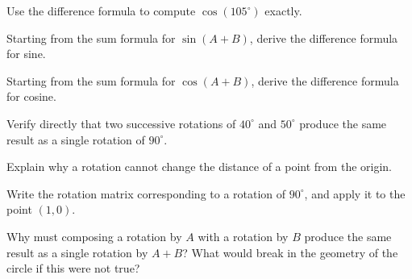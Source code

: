 \begin{exercise}
Use the difference formula to compute $\cos(105^\circ)$ exactly.
\end{exercise}

\begin{exercise}
Starting from the sum formula for $\sin(A+B)$, derive the difference
formula for sine.
\end{exercise}

\begin{exercise}
Starting from the sum formula for $\cos(A+B)$, derive the difference
formula for cosine.
\end{exercise}

\begin{exercise}
Verify directly that two successive rotations of $40^\circ$ and $50^\circ$
produce the same result as a single rotation of $90^\circ$.
\end{exercise}

\begin{exercise}
Explain why a rotation cannot change the distance of a point from the
origin.
\end{exercise}

\begin{exercise}
Write the rotation matrix corresponding to a rotation of $90^\circ$, and
apply it to the point $(1,0)$.
\end{exercise}

\begin{exercise}
Why must composing a rotation by $A$ with a rotation by $B$ produce the
same result as a single rotation by $A+B$? What would break in the
geometry of the circle if this were not true?
\end{exercise}
